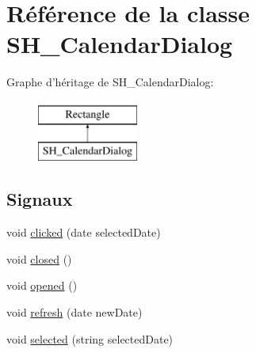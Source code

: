 \hypertarget{classSH__CalendarDialog}{\section{Référence de la classe S\-H\-\_\-\-Calendar\-Dialog}
\label{classSH__CalendarDialog}
}
Graphe d'héritage de S\-H\-\_\-\-Calendar\-Dialog\-:\begin{figure}[H]
\begin{center}
\leavevmode
\includegraphics[height=2.000000cm]{classSH__CalendarDialog}
\end{center}
\end{figure}
\subsection*{Signaux}
\begin{DoxyCompactItemize}
\item 
void \hyperlink{classSH__CalendarDialog_adc1e1f6d36a960208d514b755d6dcbce}{clicked} (date selected\-Date)
\item 
void \hyperlink{classSH__CalendarDialog_af19f989c106fa3dc9bebfdce81f725a7}{closed} ()
\item 
void \hyperlink{classSH__CalendarDialog_a1d6508a56b50647f3fec511088441728}{opened} ()
\item 
void \hyperlink{classSH__CalendarDialog_a8f5eeb3f224244a233d0c757840cc3ed}{refresh} (date new\-Date)
\item 
void \hyperlink{classSH__CalendarDialog_a4513e8bce3e2bca355c8ce130eacfef1}{selected} (string selected\-Date)
\end{DoxyCompactItemize}
